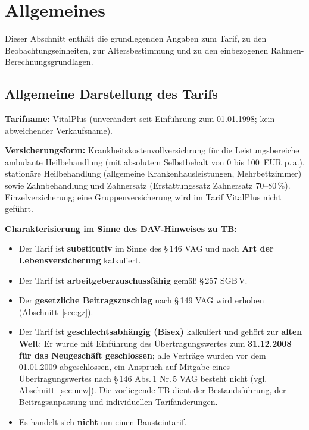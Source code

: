 \section{Allgemeines}\label{sec:allgemeines}

Dieser Abschnitt enthält die grundlegenden Angaben zum Tarif, zu den
Beobachtungseinheiten, zur Altersbestimmung und zu den einbezogenen
Rahmen-Berechnungsgrundlagen.

\subsection{Allgemeine Darstellung des Tarifs}\label{sec:tarifdarstellung}

\textbf{Tarifname:} VitalPlus (unverändert seit Einführung zum
01.01.1998; kein abweichender Verkaufsname).

\textbf{Versicherungsform:} Krankheitskostenvollversichrung für die
Leistungsbereiche ambulante Heilbehandlung (mit absolutem Selbstbehalt
von 0 bis 100~EUR p.\,a.), stationäre Heilbehandlung (allgemeine
Krankenhausleistungen, Mehrbettzimmer) sowie Zahnbehandlung und
Zahnersatz (Erstattungssatz Zahnersatz 70--80\,\%). Einzelversicherung;
eine Gruppenversicherung wird im Tarif VitalPlus nicht geführt.

\textbf{Charakterisierung im Sinne des DAV-Hinweises zu TB:}
\begin{itemize}\itemsep2pt
  \item Der Tarif ist \textbf{substitutiv} im Sinne des \S\,146 VAG und
        nach \textbf{Art der Lebensversicherung} kalkuliert.
  \item Der Tarif ist \textbf{arbeitgeberzuschussfähig} gemäß
        \S\,257 SGB\,V.
  \item Der \textbf{gesetzliche Beitragszuschlag} nach \S\,149 VAG wird
        erhoben (Abschnitt~\ref{sec:gz}).
  \item Der Tarif ist \textbf{geschlechtsabhängig (Bisex)} kalkuliert und
        gehört zur \textbf{alten Welt}: Er wurde mit Einführung des
        Übertragungswertes zum \textbf{31.12.2008 für das Neugeschäft
        geschlossen}; alle Verträge wurden vor dem 01.01.2009
        abgeschlossen, ein Anspruch auf Mitgabe eines
        Übertragungswertes nach \S\,146 Abs.\,1 Nr.\,5 VAG besteht
        nicht (vgl. Abschnitt~\ref{sec:uew}). Die vorliegende TB dient
        der Bestandsführung, der Beitragsanpassung und individuellen
        Tarifänderungen.
  \item Es handelt sich \textbf{nicht} um einen Bausteintarif.
\end{itemize}

